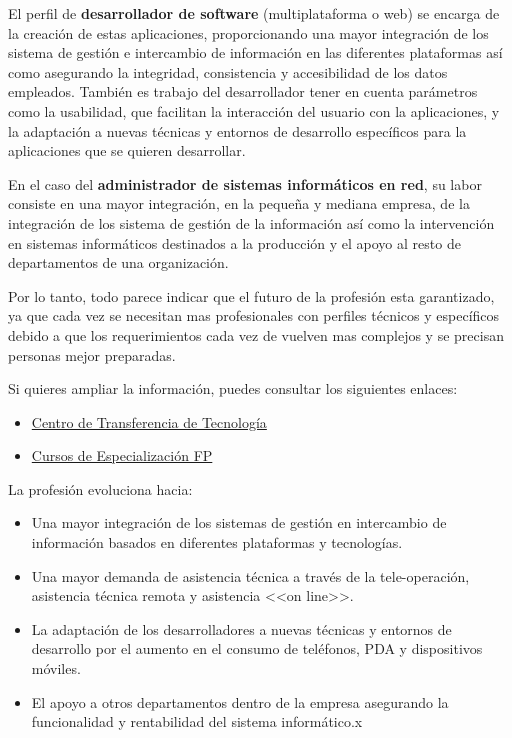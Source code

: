 El perfil de \textbf{desarrollador de software} (multiplataforma o web) se encarga de la creación de estas aplicaciones, proporcionando una mayor integración de los sistema de gestión e intercambio de información en las diferentes plataformas así como asegurando la integridad, consistencia y accesibilidad de los datos empleados. También es trabajo del desarrollador tener en cuenta parámetros como la usabilidad, que facilitan la interacción del usuario con la aplicaciones, y la adaptación a nuevas técnicas y entornos de desarrollo específicos para la aplicaciones que se quieren desarrollar.

En el caso del \textbf{administrador de sistemas informáticos en red}, su labor consiste en una mayor integración, en la pequeña y mediana empresa, de la integración de los sistema de gestión de la información	así como la intervención en sistemas informáticos destinados a la producción y el apoyo al resto de departamentos de una organización.

Por lo tanto, todo parece indicar que el futuro de la profesión esta garantizado, ya que cada vez se necesitan mas profesionales con perfiles técnicos y específicos debido a que los requerimientos cada vez de vuelven mas complejos y se precisan personas mejor preparadas.

Si quieres ampliar la información, puedes consultar los siguientes enlaces:

\begin{itemize}
    \item \href{https://administracionelectronica.gob.es/pae_Home?_nfpb=true&_pageLabel=P1200733131296129097704&langPae=es#faq1}{Centro de Transferencia de Tecnología}
    \item \href{https://educacionadistancia.juntadeandalucia.es/formacionprofesional/mod/scorm/player.php?a=6198&scoid=178876&currentorg=eXe68448_2zip5d5bab14269131fb5c2&mode=&attempt=1}{Cursos de Especialización FP}
\end{itemize}

\begin{tcolorbox}[sharp corners, colback=green!20, colframe=magenta!90, title=\textbf{\Large Recuerda que...}]
    La profesión evoluciona hacia:
    \begin{itemize}
        \item Una mayor integración de los sistemas de gestión en intercambio de información basados en diferentes plataformas y tecnologías.
        \item Una mayor demanda de asistencia técnica a través de la tele-operación, asistencia técnica remota y asistencia <<on line>>.
        \item La adaptación de los desarrolladores a nuevas técnicas y entornos de desarrollo por el aumento en el consumo de teléfonos, PDA y dispositivos móviles.
        \item El apoyo a otros departamentos dentro de la empresa asegurando la funcionalidad y rentabilidad del sistema informático.x
    \end{itemize}
\end{tcolorbox}

